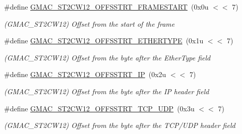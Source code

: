 \begin{DoxyCompactItemize}
\item 
\mbox{\label{group__SAME70__GMAC_gab73da65a37e6dcfbb1def8e5c0e08184}} 
\#define \mbox{\hyperlink{group__SAME70__GMAC_gab73da65a37e6dcfbb1def8e5c0e08184}{G\+M\+A\+C\+\_\+\+S\+T2\+C\+W12\+\_\+\+O\+F\+F\+S\+S\+T\+R\+T\+\_\+\+F\+R\+A\+M\+E\+S\+T\+A\+RT}}~(0x0u $<$$<$ 7)
\begin{DoxyCompactList}\small\item\em (G\+M\+A\+C\+\_\+\+S\+T2\+C\+W12) Offset from the start of the frame \end{DoxyCompactList}\item 
\mbox{\label{group__SAME70__GMAC_ga37c45624ec98a85ed649d8acdc13e541}} 
\#define \mbox{\hyperlink{group__SAME70__GMAC_ga37c45624ec98a85ed649d8acdc13e541}{G\+M\+A\+C\+\_\+\+S\+T2\+C\+W12\+\_\+\+O\+F\+F\+S\+S\+T\+R\+T\+\_\+\+E\+T\+H\+E\+R\+T\+Y\+PE}}~(0x1u $<$$<$ 7)
\begin{DoxyCompactList}\small\item\em (G\+M\+A\+C\+\_\+\+S\+T2\+C\+W12) Offset from the byte after the Ether\+Type field \end{DoxyCompactList}\item 
\mbox{\label{group__SAME70__GMAC_ga632c60a499153614535a08467c2bc068}} 
\#define \mbox{\hyperlink{group__SAME70__GMAC_ga632c60a499153614535a08467c2bc068}{G\+M\+A\+C\+\_\+\+S\+T2\+C\+W12\+\_\+\+O\+F\+F\+S\+S\+T\+R\+T\+\_\+\+IP}}~(0x2u $<$$<$ 7)
\begin{DoxyCompactList}\small\item\em (G\+M\+A\+C\+\_\+\+S\+T2\+C\+W12) Offset from the byte after the IP header field \end{DoxyCompactList}\item 
\mbox{\label{group__SAME70__GMAC_ga5d6d1664ac151e087262ecfbe28f1ba4}} 
\#define \mbox{\hyperlink{group__SAME70__GMAC_ga5d6d1664ac151e087262ecfbe28f1ba4}{G\+M\+A\+C\+\_\+\+S\+T2\+C\+W12\+\_\+\+O\+F\+F\+S\+S\+T\+R\+T\+\_\+\+T\+C\+P\+\_\+\+U\+DP}}~(0x3u $<$$<$ 7)
\begin{DoxyCompactList}\small\item\em (G\+M\+A\+C\+\_\+\+S\+T2\+C\+W12) Offset from the byte after the T\+C\+P/\+U\+DP header field \end{DoxyCompactList}\item 
\mbox{\label{group__SAME70__GMAC_ga581ddefe19c4a09338ff122184403206}} 

\end{DoxyCompactItemize}
